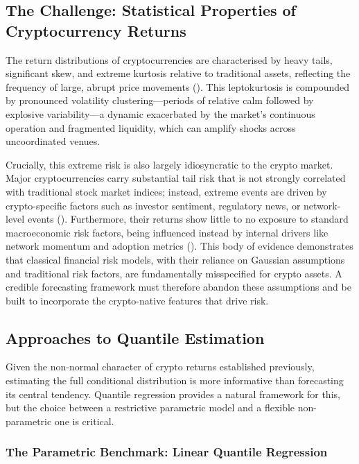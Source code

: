 \documentclass[
  a4paper,
  DIV=11,
  numbers=noendperiod]{scrreprt}
\begin{document}
\subsection{The Challenge: Statistical Properties of Cryptocurrency
Returns}\label{the-challenge-statistical-properties-of-cryptocurrency-returns}

The return distributions of cryptocurrencies are characterised by heavy
tails, significant skew, and extreme kurtosis relative to traditional
assets, reflecting the frequency of large, abrupt price movements
(). This
leptokurtosis is compounded by pronounced volatility
clustering---periods of relative calm followed by explosive
variability---a dynamic exacerbated by the market's continuous operation
and fragmented liquidity, which can amplify shocks across uncoordinated
venues.

Crucially, this extreme risk is also largely idiosyncratic to the crypto
market. Major cryptocurrencies carry substantial tail risk that is not
strongly correlated with traditional stock market indices; instead,
extreme events are driven by crypto-specific factors such as investor
sentiment, regulatory news, or network-level events
(). Furthermore, their returns show
little to no exposure to standard macroeconomic risk factors, being
influenced instead by internal drivers like network momentum and
adoption metrics (). This
body of evidence demonstrates that classical financial risk models, with
their reliance on Gaussian assumptions and traditional risk factors, are
fundamentally misspecified for crypto assets. A credible forecasting
framework must therefore abandon these assumptions and be built to
incorporate the crypto-native features that drive risk.

\subsection{Approaches to Quantile
Estimation}\label{approaches-to-quantile-estimation}

Given the non-normal character of crypto returns established previously,
estimating the full conditional distribution is more informative than
forecasting its central tendency. Quantile regression provides a natural
framework for this, but the choice between a restrictive parametric
model and a flexible non-parametric one is critical.

\subsubsection{The Parametric Benchmark: Linear Quantile
Regression}\label{the-parametric-benchmark-linear-quantile-regression}
\end{document}
